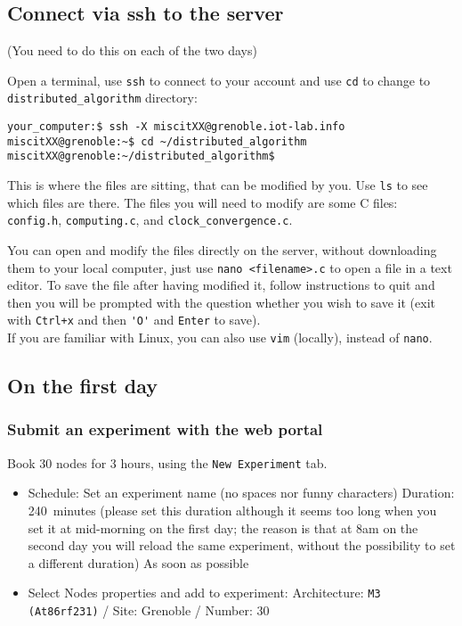 \documentclass[oneside]{article}
\begin{document}
\subsection{Connect via ssh to the server}
(You need to do this on each of the two days)

Open a terminal, use \verb=ssh= to connect to your account and use \verb=cd= to change to \verb=distributed_algorithm= directory:
\begin{verbatim}your_computer:$ ssh -X miscitXX@grenoble.iot-lab.info
miscitXX@grenoble:~$ cd ~/distributed_algorithm
miscitXX@grenoble:~/distributed_algorithm$
\end{verbatim}
This is where the files are sitting, that can be modified by you.
Use \verb=ls= to see which files are there. 
The files you will need to modify are some C files: \verb=config.h=, \verb=computing.c=, and \verb=clock_convergence.c=.

You can open and modify the files directly on the server, without downloading
them to your local computer, just use \verb=nano <filename>.c= to open a file in
a text editor. To save the file after having modified it, follow instructions to
quit and then you will be prompted with the question whether you wish to save it
(exit with \verb=Ctrl+x= and then \verb='O'= and \verb=Enter= to save).\\
If you are familiar with Linux, you can also use \verb=vim= (locally), instead of \verb=nano=.

\subsection{On the first day}


\subsubsection{Submit an experiment with the web portal}
Book 30 nodes for 3 hours, using the \verb=New Experiment= tab.
\begin{itemize}
\item Schedule:
\subitem Set an experiment name (no spaces nor funny characters)
\subitem Duration: 240~minutes (please set this duration although it seems too long when you set it at mid-morning on the first day; the reason is that at 8am on the second day you will reload the same experiment, without the possibility to set a different duration)
\subitem As soon as possible
\item Select Nodes properties and add to experiment: 
\subitem Architecture: \texttt{M3 (At86rf231)} / Site: Grenoble / Number: $30$
\end{itemize}
\end{document}
